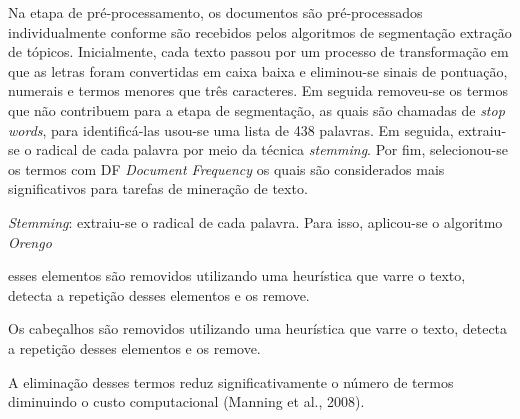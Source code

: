 
Na etapa de pré-processamento, os documentos são pré-processados individualmente conforme são recebidos pelos algoritmos de segmentação extração de tópicos. 
Inicialmente, cada texto passou por um processo de transformação em que as letras foram convertidas em caixa baixa e eliminou-se sinais de pontuação, numerais e termos menores que três caracteres. Em seguida removeu-se os termos que não contribuem para a etapa de segmentação, as quais são chamadas de \textit{stop words}, para identificá-las usou-se uma lista de 438 palavras. Em seguida, extraiu-se o radical de cada palavra por meio da técnica \textit{stemming}. Por fim, selecionou-se os termos com DF \textit{Document Frequency}  os quais são considerados mais significativos para tarefas de mineração de texto.



\textit{Stemming}: extraiu-se o radical de cada palavra. Para isso, aplicou-se o algoritmo \textit{Orengo} %













esses elementos são removidos utilizando uma heurística que varre o texto, detecta a repetição desses elementos e os remove.


Os cabeçalhos são removidos utilizando uma heurística que varre o texto, detecta a repetição desses elementos e os remove.

A eliminação desses termos reduz significativamente o número de termos diminuindo o custo computacional (Manning et al., 2008).































